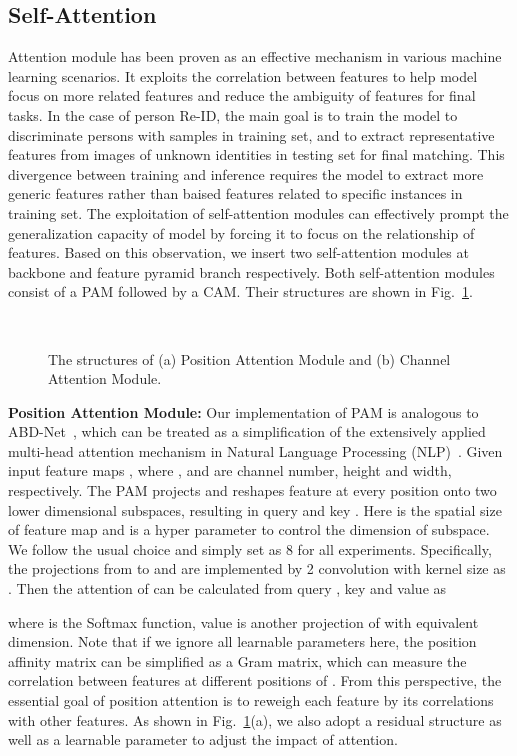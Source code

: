 \documentclass[journal]{IEEEtran}
\begin{document}
\subsection{Self-Attention}Attention module has been proven as an effective mechanism in various machine learning scenarios.
It exploits the correlation between features to help model focus on more related features and reduce the ambiguity of features for final tasks.
In the case of person Re-ID, the main goal is to train the model to discriminate persons with samples in training set, and to extract representative features from images of unknown identities in testing set for final matching.
This divergence between training and inference requires the model to extract more generic features rather than baised features related to specific instances in training set.
The exploitation of self-attention modules can effectively prompt the generalization capacity of model by forcing it to focus on the relationship of features.
Based on this observation, we insert two self-attention modules at backbone and feature pyramid branch respectively.
Both self-attention modules consist of a PAM followed by a CAM.
Their structures are shown in Fig.~\ref{fig:attention}. 
\begin{figure}
\centering
  \label{fig:a_pam} \\
  \label{fig:a_cam}
  \caption{The structures of (a) Position Attention Module and (b) Channel Attention Module.}
  \label{fig:attention}
\end{figure}

\textbf{Position Attention Module:} Our implementation of PAM is analogous to ABD-Net~\cite{chen2019ABD}, which can be treated as a simplification of the extensively applied multi-head attention mechanism in Natural Language Processing (NLP)~\cite{vaswani2017attention}.
Given input feature maps , where ,  and  are channel number, height and width, respectively.
The PAM projects and reshapes feature at every position onto two lower dimensional subspaces, resulting in query  and key . 
Here  is the spatial size of feature map and  is a hyper parameter to control the dimension of subspace.
We follow the usual choice and simply set  as 8 for all experiments.
Specifically, the projections from  to  and  are implemented by 2 convolution with kernel size as .
Then the attention of  can be calculated from query , key  and value  as

where  is the Softmax function, value  is another projection of  with equivalent dimension. 
Note that if we ignore all learnable parameters here, the position affinity matrix  can be simplified as a Gram matrix, which can measure the correlation between features at different positions of .
From this perspective, the essential goal of position attention is to reweigh each feature by its correlations with other features.
As shown in Fig.~\ref{fig:attention}(a), we also adopt a residual structure as well as a learnable parameter  to adjust the impact of attention.
\end{document}
